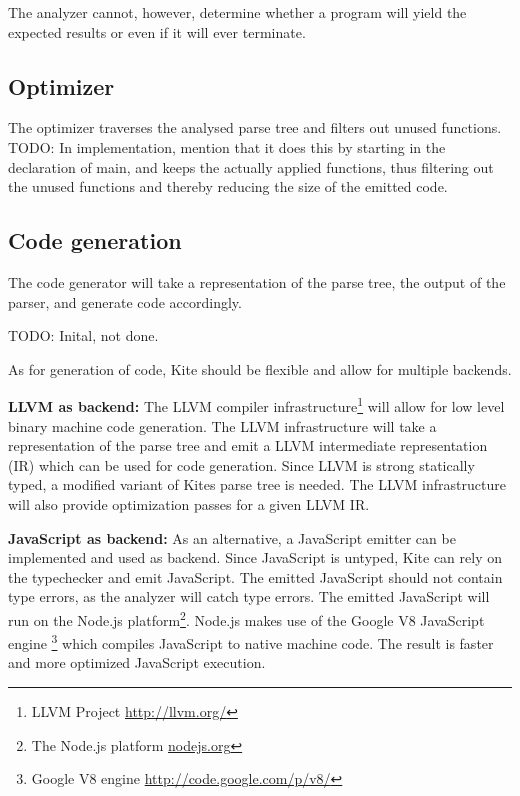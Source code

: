 The analyzer cannot, however, determine whether a program will yield the expected results or even if it will ever terminate.


\subsection{Optimizer}
The optimizer traverses the analysed parse tree and filters out unused functions. 
TODO: In implementation, mention that it does this by starting in the declaration of main, and keeps the actually applied functions, thus filtering out the unused functions and thereby reducing the size of the emitted code. 


\subsection{Code generation}
The code generator will take a representation of the
parse tree, the output of the parser, and generate code
accordingly. 


TODO: Inital, not done.

As for generation of code, Kite should be flexible and allow for
multiple backends.

\textbf{LLVM as backend:} The LLVM compiler
infrastructure\footnote{LLVM Project \url{http://llvm.org/}} will allow
for low level binary machine code generation. The LLVM infrastructure
will take a representation of the parse tree and emit a LLVM
intermediate representation (IR) which can be used for code
generation. Since LLVM is strong statically typed, a modified variant
of Kites parse tree is needed. The LLVM infrastructure will also provide
optimization passes for a given LLVM IR. 

\textbf{JavaScript as backend:} As an alternative, a JavaScript emitter
can be implemented and used as backend. Since JavaScript is untyped,
Kite can rely on the typechecker and emit JavaScript. The emitted
JavaScript should not contain type errors, as the analyzer will
catch type errors. The emitted JavaScript will run on the
Node.js platform\footnote{ The Node.js platform \url{nodejs.org}}.
Node.js makes use of the Google V8 JavaScript engine \footnote{Google
  V8 engine \url{http://code.google.com/p/v8/}} which compiles JavaScript to
native machine code. The result is faster and more optimized
JavaScript execution.

